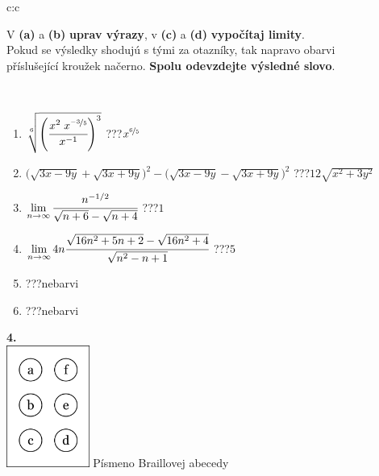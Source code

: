 \documentclass[10pt]{report}
\begin{document}
\begin{tabular}{c:c}
\begin{minipage}[c][104.5mm][t]{0.5\linewidth}
\begin{center}
\begin{minipage}{0.95\linewidth}
\begin{center}
V \textbf{(a)} a \textbf{(b)} \textbf{uprav výrazy}, v \textbf{(c)} a \textbf{(d)} \textbf{vypočítaj limity}.\\Pokud se výsledky shodujú s tými za otazníky, tak napravo obarvi\\příslušející kroužek načerno. \textbf{Spolu odevzdejte výsledné slovo}.
\end{center}
\end{minipage}
\\[1mm]
\begin{minipage}{0.79\linewidth}
\begin{center}
\begin{varwidth}{\linewidth}
\begin{enumerate}
\small
\item $\sqrt[6]{\left(\cfrac{x^{2}\;x^{\nicefrac{-3}{5}}}{x^{-1}}\right)^{3}}$\quad \dotfill\; ???\;\dotfill \quad $x^{\nicefrac{6}{5}}$
\item {\footnotesize{\scriptsize$\big(\sqrt{3x-9y}+\sqrt{3x+9y}\big)^2-\big(\sqrt{3x-9y}-\sqrt{3x+9y}\big)^2$}\quad \dotfill\; ???\;\dotfill \quad $12\sqrt{x^2+3y^2}$}
\item $\lim\limits_{n\to\infty}\cfrac{n^{-1/2}}{\sqrt{n+6}-\sqrt{n+4}}$\quad \dotfill\; ???\;\dotfill \quad $1$
\item $\lim\limits_{n\to\infty}4n\cfrac{\sqrt{16n^2+5n+2}-\sqrt{16n^2+4}}{\sqrt{n^2-n+1}}$\quad \dotfill\; ???\;\dotfill \quad $5$
\item \quad \dotfill\; ???\;\dotfill \quad nebarvi
\item \quad \dotfill\; ???\;\dotfill \quad nebarvi
\end{enumerate}
\end{varwidth}
\end{center}
\end{minipage}
\begin{minipage}{0.20\linewidth}
\begin{center}
{\Huge\bfseries 4.} \\[2mm]
\includegraphics[height=40mm]{../images/braille.png}
{\small Písmeno Braillovej abecedy}
\end{center}
\end{minipage}
\end{center}
\end{minipage}
%
\end{tabular}
\end{document}
